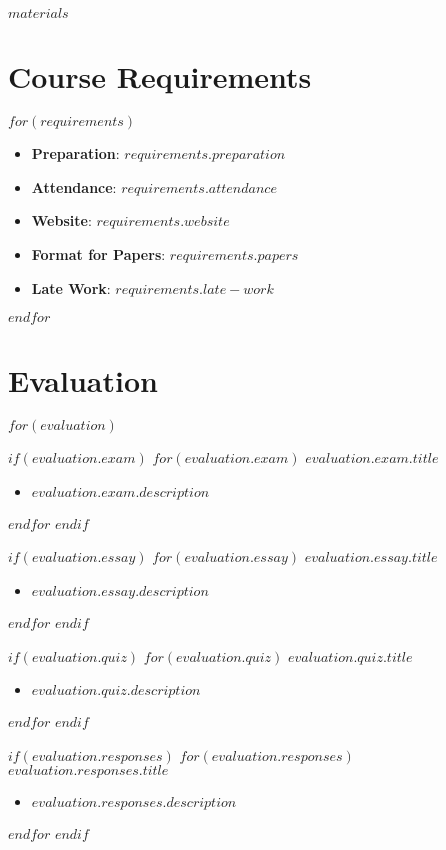 \documentclass[$fontsize$, letterpaper]{article}
\begin{document}
$materials$

\section*{Course Requirements}
$for(requirements)$
\begin{itemize}[leftmargin=*]
\item \textbf{Preparation}: $requirements.preparation$
\item \textbf{Attendance}: $requirements.attendance$
\item \textbf{Website}: $requirements.website$
\item \textbf{Format for Papers}: $requirements.papers$
\item \textbf{Late Work}: $requirements.late-work$
\end{itemize}
$endfor$

\section*{Evaluation}

$for(evaluation)$

$if(evaluation.exam)$
  $for(evaluation.exam)$ 
    \textbf{$evaluation.exam.title$}
    \begin{itemize}[leftmargin=*]
    \item $evaluation.exam.description$ 
    \end{itemize}
  $endfor$
$endif$

$if(evaluation.essay)$
  $for(evaluation.essay)$ 
    \textbf{$evaluation.essay.title$}
    \begin{itemize}[leftmargin=*]
    \item $evaluation.essay.description$ 
    \end{itemize}
  $endfor$
$endif$

$if(evaluation.quiz)$
  $for(evaluation.quiz)$ 
    \textbf{$evaluation.quiz.title$}
    \begin{itemize}[leftmargin=*]
    \item $evaluation.quiz.description$ 
    \end{itemize}
  $endfor$
$endif$

$if(evaluation.responses)$
  $for(evaluation.responses)$ 
    \textbf{$evaluation.responses.title$}
    \begin{itemize}[leftmargin=*]
    \item $evaluation.responses.description$ 
    \end{itemize}
  $endfor$
$endif$
\end{document}
